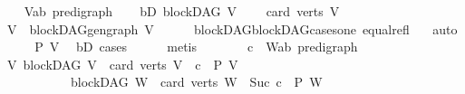 \begin{isabellebody}
\isamarkupfalse%
\isanewline
\ \ \isamarkupfalse%
\ V{\isacharcolon}{\kern0pt}{\isacharcolon}{\kern0pt}{\isachardoublequoteopen}{\isacharparenleft}{\kern0pt}{\isacharprime}{\kern0pt}a{\isacharcomma}{\kern0pt}{\isacharprime}{\kern0pt}b{\isacharparenright}{\kern0pt}\ pre{\isacharunderscore}{\kern0pt}digraph{\isachardoublequoteclose}\isanewline
\ \ \isamarkupfalse%
\ bD{\isacharcolon}{\kern0pt}\ {\isachardoublequoteopen}blockDAG\ V{\isachardoublequoteclose}\ \isanewline
\ \ \ {\isachardoublequoteopen}card\ {\isacharparenleft}{\kern0pt}verts\ V{\isacharparenright}{\kern0pt}\ {\isacharequal}{\kern0pt}\ {}{\isachardoublequoteclose}\isanewline
\ \ \isamarkupfalse%
\ \isamarkupfalse%
\ {\isachardoublequoteopen}V\ {\isacharequal}{\kern0pt}\ blockDAG{\isachardot}{\kern0pt}gen{\isacharunderscore}{\kern0pt}graph\ V{\isachardoublequoteclose}\isanewline
\ \ \ \ \isamarkupfalse%
\ blockDAG{\isachardot}{\kern0pt}blockDAG{\isacharunderscore}{\kern0pt}cases{\isacharunderscore}{\kern0pt}one\ equal{\isacharunderscore}{\kern0pt}refl\ \ \isamarkupfalse%
\ auto\isanewline
\ \ \isamarkupfalse%
\ \isamarkupfalse%
\ {\isachardoublequoteopen}P\ V{\isachardoublequoteclose}\ \isamarkupfalse%
\ bD\ cases{\isacharparenleft}{\kern0pt}{}{\isacharparenright}{\kern0pt}\isanewline
\ \ \ \ \isamarkupfalse%
\ metis\ \ \isanewline
{}\isamarkupfalse%
\ \isanewline
\ \ \isamarkupfalse%
\ c\ \ W{\isacharcolon}{\kern0pt}{\isacharcolon}{\kern0pt}{\isachardoublequoteopen}{\isacharparenleft}{\kern0pt}{\isacharprime}{\kern0pt}a{\isacharcomma}{\kern0pt}{\isacharprime}{\kern0pt}b{\isacharparenright}{\kern0pt}\ pre{\isacharunderscore}{\kern0pt}digraph{\isachardoublequoteclose}\isanewline
\ \ \isamarkupfalse%
\ {\isachardoublequoteopen}{\isacharparenleft}{\kern0pt}{\isasymAnd}V{\isachardot}{\kern0pt}\ blockDAG\ V\ {\isasymLongrightarrow}\ card\ {\isacharparenleft}{\kern0pt}verts\ V{\isacharparenright}{\kern0pt}\ {\isacharequal}{\kern0pt}\ c\ {\isasymLongrightarrow}\ P\ V{\isacharparenright}{\kern0pt}\ {\isasymLongrightarrow}\isanewline
\ \ \ \ \ \ \ \ \ \ \ blockDAG\ W\ {\isasymLongrightarrow}\ card\ {\isacharparenleft}{\kern0pt}verts\ W{\isacharparenright}{\kern0pt}\ {\isacharequal}{\kern0pt}\ Suc\ c\ {\isasymLongrightarrow}\ P\ W{\isachardoublequoteclose}\isanewline
\ \ \isamarkupfalse%
\ {\isacharminus}{\kern0pt}\isanewline

\end{isabellebody}
